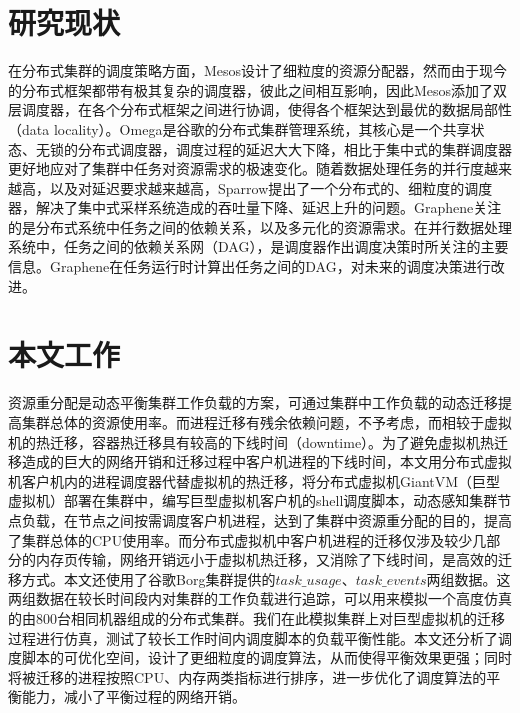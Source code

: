 \section{研究现状}
\label{chap:dissch}
在分布式集群的调度策略方面，Mesos\cite{mesos}设计了细粒度的资源分配器，然而由于现今的分布式框架都带有极其复杂的调度器，彼此之间相互影响，因此Mesos添加了双层调度器，在各个分布式框架之间进行协调，使得各个框架达到最优的数据局部性（data locality）。Omega\cite{omega}是谷歌的分布式集群管理系统，其核心是一个共享状态、无锁的分布式调度器，调度过程的延迟大大下降，相比于集中式的集群调度器更好地应对了集群中任务对资源需求的极速变化。随着数据处理任务的并行度越来越高，以及对延迟要求越来越高，Sparrow\cite{sparrow}提出了一个分布式的、细粒度的调度器，解决了集中式采样系统造成的吞吐量下降、延迟上升的问题。Graphene\cite{graphene}关注的是分布式系统中任务之间的依赖关系，以及多元化的资源需求。在并行数据处理系统中，任务之间的依赖关系网（DAG），是调度器作出调度决策时所关注的主要信息。Graphene在任务运行时计算出任务之间的DAG，对未来的调度决策进行改进。

\section{本文工作}
资源重分配是动态平衡集群工作负载的方案，可通过集群中工作负载的动态迁移提高集群总体的资源使用率。而进程迁移有残余依赖问题，不予考虑，而相较于虚拟机的热迁移，容器热迁移具有较高的下线时间（downtime）。为了避免虚拟机热迁移造成的巨大的网络开销和迁移过程中客户机进程的下线时间，本文用分布式虚拟机客户机内的进程调度器代替虚拟机的热迁移，将分布式虚拟机GiantVM（巨型虚拟机）部署在集群中，编写巨型虚拟机客户机的shell调度脚本，动态感知集群节点负载，在节点之间按需调度客户机进程，达到了集群中资源重分配的目的，提高了集群总体的CPU使用率。而分布式虚拟机中客户机进程的迁移仅涉及较少几部分的内存页传输，网络开销远小于虚拟机热迁移，又消除了下线时间，是高效的迁移方式。本文还使用了谷歌Borg集群提供的$task\_usage$、$task\_events$两组数据。这两组数据在较长时间段内对集群的工作负载进行追踪，可以用来模拟一个高度仿真的由800台相同机器组成的分布式集群。我们在此模拟集群上对巨型虚拟机的迁移过程进行仿真，测试了较长工作时间内调度脚本的负载平衡性能。本文还分析了调度脚本的可优化空间，设计了更细粒度的调度算法，从而使得平衡效果更强；同时将被迁移的进程按照CPU、内存两类指标进行排序，进一步优化了调度算法的平衡能力，减小了平衡过程的网络开销。



